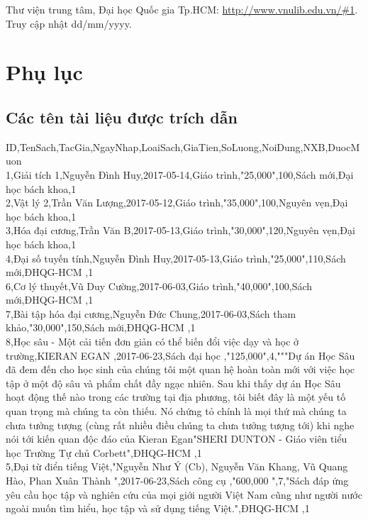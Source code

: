 \documentclass[a4paper]{article}
\begin{document}
\begin{thebibliography}{99999}
 {Thư viện trung tâm, Đại học Quốc gia Tp.HCM: \url{http://www.vnulib.edu.vn/#1}}. Truy cập nhật dd/mm/yyyy.
\end{thebibliography} 
\newpage
\newpage
\section{Phụ lục}
\subsection{Các tên tài liệu được trích dẫn}
\label{sec:tailieu}
ID,TenSach,TacGia,NgayNhap,LoaiSach,GiaTien,SoLuong,NoiDung,NXB,DuocMuon\\
1,Giải tích 1,Nguyễn Đình Huy,2017-05-14,Giáo trình,"25,000",100,Sách mới,Đại học bách khoa,1\\
2,Vật lý 2,Trần Văn Lượng,2017-05-12,Giáo trình,"35,000",100,Nguyên vẹn,Đại học bách khoa,1\\
3,Hóa đại cương,Trần Văn B,2017-05-13,Giáo trình,"30,000",120,Nguyên vẹn,Đại học bách khoa,1\\
4,Đại số tuyến tính,Nguyễn Đình Huy,2017-05-13,Giáo trình,"25,000",110,Sách mới,ĐHQG-HCM ,1\\
6,Cơ lý thuyết,Vũ Duy Cường,2017-06-03,Giáo trình,"40,000",100,Sách mới,ĐHQG-HCM ,1\\
7,Bài tập hóa đại cương,Nguyễn Đức Chung,2017-06-03,Sách tham khảo,"30,000",150,Sách mới,ĐHQG-HCM ,1\\
8,Học sâu - Một cải tiến đơn giản có thể biến đổi việc dạy và học ở trường,KIERAN EGAN ,2017-06-23,Sách đại học ,"125,000",4,"""Dự án Học Sâu đã đem đến cho học sinh của chúng tôi một quan hệ hoàn toàn mới với việc học tập ở một độ sâu và phẩm chất đầy ngạc nhiên. Sau khi thấy dự án Học Sâu hoạt động thế nào trong các trường tại địa phương, tôi biết đây là một yếu tố quan trọng mà chúng ta còn thiếu. Nó chứng tỏ chính là mọi thứ mà chúng ta chưa tưởng tượng (cùng rất nhiều điều chúng ta chưa tưởng tượng tới) khi nghe nói tới kiến quan độc đáo của Kieran Egan"SHERI DUNTON - Giáo viên tiểu học Trường Tự chủ Corbett",ĐHQG-HCM ,1\\
5,Đại từ điển tiếng Việt,"Nguyễn Như Ý (Cb), Nguyễn Văn Khang, Vũ Quang Hào, Phan Xuân Thành ",2017-06-23,Sách công cụ ,"600,000 ",7,"Sách đáp ứng yêu cầu học tập và nghiên cứu của mọi giới người Việt Nam cũng như người nước ngoài muốn tìm hiểu, học tập và sử dụng tiếng Việt.",ĐHQG-HCM ,1\\
\end{document}

